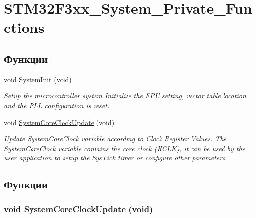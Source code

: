 \hypertarget{group___s_t_m32_f3xx___system___private___functions}{
\section{STM32F3xx\_\-System\_\-Private\_\-Functions}
\label{group___s_t_m32_f3xx___system___private___functions}
}
\subsection*{Функции}
\begin{CompactItemize}
\item 
void \hyperlink{group___s_t_m32_f3xx___system___private___functions_g93f514700ccf00d08dbdcff7f1224eb2}{SystemInit} (void)
\begin{CompactList}\small\item\em Setup the microcontroller system Initialize the FPU setting, vector table location and the PLL configuration is reset. \item\end{CompactList}\item 
void \hyperlink{group___s_t_m32_f3xx___system___private___functions_ge0c36a9591fe6e9c45ecb21a794f0f0f}{SystemCoreClockUpdate} (void)
\begin{CompactList}\small\item\em Update SystemCoreClock variable according to Clock Register Values. The SystemCoreClock variable contains the core clock (HCLK), it can be used by the user application to setup the SysTick timer or configure other parameters. \item\end{CompactList}\end{CompactItemize}


\subsection{Функции}
\hypertarget{group___s_t_m32_f3xx___system___private___functions_ge0c36a9591fe6e9c45ecb21a794f0f0f}{
\subsubsection[{SystemCoreClockUpdate}]{\setlength{\rightskip}{0pt plus 5cm}void SystemCoreClockUpdate (void)}}
\label{group___s_t_m32_f3xx___system___private___functions_ge0c36a9591fe6e9c45ecb21a794f0f0f}


